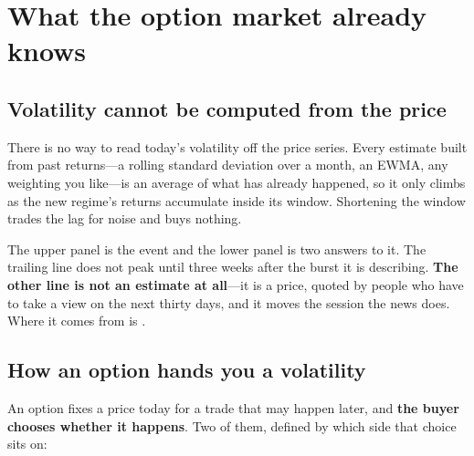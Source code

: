 \section{What the option market already knows}\label{sec:option-market}

\subsection{Volatility cannot be computed from the price}\label{sec:vol-not-from-price}

There is no way to read today's volatility off the price series. Every estimate built from past
returns---a rolling standard deviation over a month, an EWMA, any weighting you like---is an average
of what has already happened, so it only climbs as the new regime's returns accumulate inside its
window. Shortening the window trades the lag for noise and buys nothing.


The upper panel is the event and the lower panel is two answers to it. The trailing line does not
peak until three weeks after the burst it is describing. \textbf{The other line is not an estimate
at all}---it is a price, quoted by people who have to take a view on the next thirty days, and it
moves the session the news does. Where it comes from is .

\subsection{How an option hands you a volatility}\label{sec:option-to-vol}

An option fixes a price today for a trade that may happen later, and \textbf{the buyer chooses
whether it happens}. Two of them, defined by which side that choice sits on:

